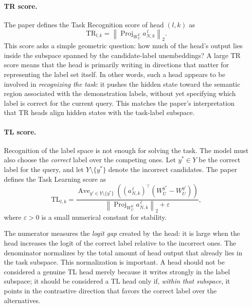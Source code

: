 \documentclass[twoside,english]{article}
\begin{document}
\paragraph{TR score.}
The paper defines the Task Recognition score of head \((l,k)\) as
\begin{equation}
\mathrm{TR}_{l,k}
=
\left\|
\operatorname{Proj}_{W_U^Y} a_{N,k}^{\,l}
\right\|_2.
\end{equation}
This score asks a simple geometric question: how much of the head's output lies inside the subspace spanned by the candidate-label unembeddings? A large TR score means that the head is primarily writing in directions that matter for representing the label set itself. In other words, such a head appears to be involved in \emph{recognizing the task}: it pushes the hidden state toward the semantic region associated with the demonstration labels, without yet specifying which label is correct for the current query. This matches the paper's interpretation that TR heads align hidden states with the task-label subspace.

\paragraph{TL score.}
Recognition of the label space is not enough for solving the task. The model must also choose the \emph{correct} label over the competing ones. Let \(y^* \in Y\) be the correct label for the query, and let \(Y \setminus \{y^*\}\) denote the incorrect candidates. The paper defines the Task Learning score as
\begin{equation}
\mathrm{TL}_{l,k}
=
\frac{
\operatorname{Ave}_{y' \in Y \setminus \{y^*\}}
\left(
(a_{N,k}^{\,l})^\top (W_U^{y^*} - W_U^{y'})
\right)
}{
\left\|
\operatorname{Proj}_{W_U^Y} a_{N,k}^{\,l}
\right\|_2 + \varepsilon
},
\end{equation}
where \(\varepsilon > 0\) is a small numerical constant for stability.

The numerator measures the \emph{logit gap} created by the head: it is large when the head increases the logit of the correct label relative to the incorrect ones. The denominator normalizes by the total amount of head output that already lies in the task subspace. This normalization is important. A head should not be considered a genuine TL head merely because it writes strongly in the label subspace; it should be considered a TL head only if, \emph{within that subspace}, it points in the contrastive direction that favors the correct label over the alternatives.
\end{document}

